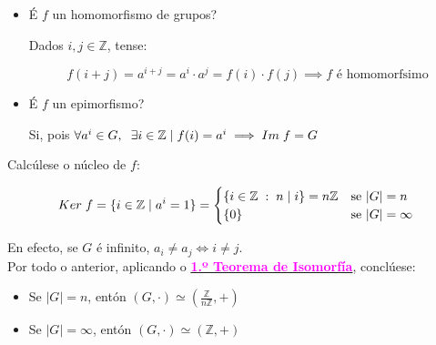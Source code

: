\documentclass[twoside]{report}
\newcommand{\magbf}[1]{\textcolor{magenta}{\textbf{#1}}} %
\theoremstyle{mystyle}
\begin{document}
\begin{itemize}
    
    \item É $f$ un homomorfismo de grupos?
    
    Dados $i,j \in \mathbb{Z}$, tense:
    
    $$f(i + j) = a^{i+j} = a^{i} \cdot a^{j} = f(i) \cdot f(j) \implies f \text{ é homomorfsimo}$$
    
    \item É $f$ un epimorfismo?
    
    Si, pois  $\forall a^{i} \in G, \hspace{2mm} \exists i \in \mathbb{Z} \hspace{1mm} | \hspace{1mm} f(i) = a^{i} \implies Im \hspace{1mm} f = G$ 
    
\end{itemize}

\vspace{2mm}

\noindent Calcúlese o núcleo de $f$:

$$Ker \hspace{1mm} f = \{i \in \mathbb{Z} \hspace{1mm} | \hspace{1mm} a^{i} = 1 \} = 
\begin{cases}
\{i \in \mathbb{Z} \hspace{1mm} : \hspace{1mm} n \hspace{1mm}| \hspace{1mm} i \} = n\mathbb{Z} & \text{se } |G| = n \\
\{0\} & \text{se } |G| = \infty
\end{cases}
$$

\noindent En efecto, se $G$ é infinito, $a_{i} \neq a_{j} \Longleftrightarrow i \neq j$.\\

\noindent Por todo o anterior, aplicando o \hyperref[th1.5]{\magbf{1.º Teorema de Isomorfía}}, conclúese:

\begin{itemize}
    \item Se $|G| = n$, entón $(G, \cdot) \simeq ( \displaystyle \frac{\mathbb{Z}}{n\mathbb{Z}}, +)$
    \item Se $|G| = \infty$, entón $(G, \cdot) \simeq (\mathbb{Z}, +)$
\end{itemize}
\end{document}
